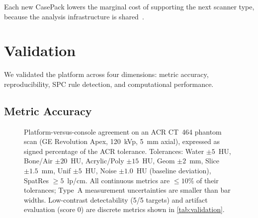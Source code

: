 \documentclass[11pt]{article}
\newcommand{\pwm}{\textsc{pwm}}
\begin{document}
Each new CasePack lowers the marginal cost of supporting the next
scanner type, because the analysis infrastructure is
shared~\cite{solveeverything}.


\section{Validation}
\label{sec:validation}

We validated the platform across four dimensions: metric accuracy,
reproducibility, SPC rule detection, and computational performance.

\subsection{Metric Accuracy}
\label{sec:val_accuracy}

\begin{figure}[t]
\centering
{}
\caption{%
  Platform-versus-console agreement on an ACR CT~464 phantom
  scan (GE Revolution Apex, 120~kVp, 5~mm axial), expressed as
  signed percentage of the ACR tolerance.
  Tolerances: Water $\pm 5$~HU, Bone/Air $\pm 20$~HU,
  Acrylic/Poly $\pm 15$~HU, Geom $\pm 2$~mm, Slice $\pm 1.5$~mm,
  Unif $\pm 5$~HU, Noise $\pm 1.0$~HU (baseline deviation),
  SpatRes $\geq 5$~lp/cm.
  All continuous metrics are $\leq 10\%$ of their tolerances;
  Type~A measurement uncertainties are smaller than bar widths.
  Low-contrast detectability (5/5 targets) and artifact evaluation
  (score 0) are discrete metrics shown in \cref{tab:validation}.
}
\label{fig:validation}
\end{figure}
\end{document}
